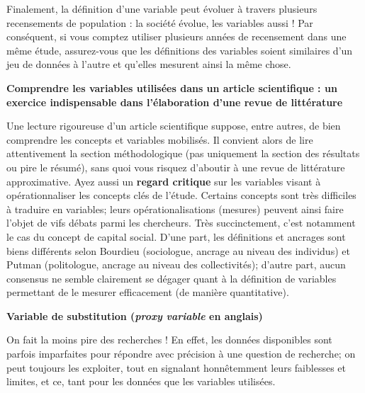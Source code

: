 \documentclass[
  11pt,
  french,
]{book}
\makeatletter
\newenvironment{kframev}{%
\medskip{}
\setlength{\fboxsep}{.8em}
 \def\at@end@of@kframev{}%
 \ifinner\ifhmode%
  \def\at@end@of@kframev{\end{minipage}}%
  \begin{minipage}{\columnwidth}%
 \fi\fi%
 \def\FrameCommand##1{\hskip\@totalleftmargin \hskip-\fboxsep
 \colorbox{shadebluecolor}{##1}\hskip-\fboxsep
     \hskip-\linewidth \hskip-\@totalleftmargin \hskip\columnwidth}%
 \MakeFramed {\advance\hsize-\width
   \@totalleftmargin\z@ \linewidth\hsize
   \@setminipage}}%
 {\par\unskip\endMakeFramed%
 \at@end@of@kframev}
\newenvironment{rmdblock}[1]
  {
  \begin{itemize}
  \renewcommand{\labelitemi}{
    \raisebox{-.7\height}[0pt][0pt]{
      {\setkeys{Gin}{width=3em,keepaspectratio}\texttt{[image: images/\#1]}}
    }
  }
  \setlength{\fboxsep}{1em}
  \begin{kframev}
  \small
  \item
  }
  {
  \end{kframev}
  \end{itemize}
  }
\newenvironment{bloc_attention}
  {\begin{rmdblock}{attention}}
  {\end{rmdblock}}
\makeatother
\begin{document}
\begin{bloc_attention}
Finalement, la définition d'une variable peut évoluer à travers plusieurs recensements de population : la société évolue, les variables aussi ! Par conséquent, si vous comptez utiliser plusieurs années de recensement dans une même étude, assurez-vous que les définitions des variables soient similaires d'un jeu de données à l'autre et qu'elles mesurent ainsi la même chose.

\textbf{Comprendre les variables utilisées dans un article scientifique : un exercice indispensable dans l'élaboration d'une revue de littérature}

Une lecture rigoureuse d'un article scientifique suppose, entre autres, de bien comprendre les concepts et variables mobilisés. Il convient alors de lire attentivement la section méthodologique (pas uniquement la section des résultats ou pire le résumé), sans quoi vous risquez d'aboutir à une revue de littérature approximative.
Ayez aussi un \textbf{regard critique} sur les variables visant à opérationnaliser les concepts clés de l'étude. Certains concepts sont très difficiles à traduire en variables; leurs opérationalisations (mesures) peuvent ainsi faire l'objet de vifs débats parmi les chercheurs. Très succinctement, c'est notamment le cas du concept de capital social. D'une part, les définitions et ancrages sont biens différents selon Bourdieu (sociologue, ancrage au niveau des individus) et Putman (politologue, ancrage au niveau des collectivités); d'autre part, aucun consensus ne semble clairement se dégager quant à la définition de variables permettant de le mesurer efficacement (de manière quantitative).

\textbf{Variable de substitution (\emph{proxy variable} en anglais)}

On fait la moins pire des recherches ! En effet, les données disponibles sont parfois imparfaites pour répondre avec précision à une question de recherche; on peut toujours les exploiter, tout en signalant honnêtemment leurs faiblesses et limites, et ce, tant pour les données que les variables utilisées.


\end{bloc_attention}
\end{document}
